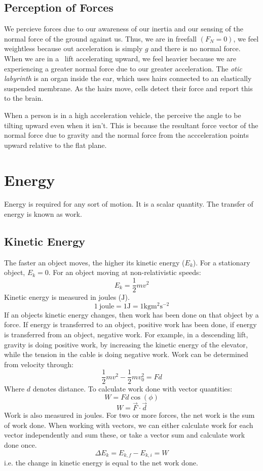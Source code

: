\documentclass[12pt]{report}
\begin{document}
\subsection*{Perception of Forces}
We percieve forces due to our awareness of our inertia and our sensing of the normal
force of the ground against us. Thus, we are in freefall \((F_N = 0)\), we feel weightless
because out acceleration is simply \(g\) and there is no normal force. When we are in a \
lift accelerating upward, we feel heavier because we are experiencing a greater normal force
due to our greater acceleration. The \textit{otic labyrinth} is an organ inside the ear, which
uses hairs connected to an elastically suspended membrane. As the hairs move, cells detect their
force and report this to the brain.

\bigskip
When a person is in a high acceleration vehicle, the perceive the angle to be tilting upward 
even when it isn't. This is because the resultant force vector of the normal force due to gravity
and the normal force from the accceleration points upward relative to the flat plane.

\section*{Energy}
Energy is required for any sort of motion. It is a scalar quantity. The transfer of 
energy is known as work.

\subsection*{Kinetic Energy}
The faster an object moves, the higher its kinetic energy (\(E_k\)). For a stationary object,
\(E_k = 0\). For an object moving at non-relativistic speeds:
\[E_k = \frac{1}{2}mv^2\]
Kinetic energy is measured in joules (\(\mathrm{J}\)).
\[1 \:\mathrm{joule} = 1\mathrm{J} = 1\mathrm{kg}\mathrm{m}^2\mathrm{s}^{-2}\]
If an objects kinetic energy changes, then work has been done on that object by a force.
If energy is transferred to an object, positive work has been done, if energy is transferred
from an object, negative work. For example, in a descending lift, gravity is doing positive work,
by increasing the kinetic energy of the elevator, while the tension in the cable is doing negative
work. Work can be determined from velocity through:
\[\frac{1}{2}mv^2 - \frac{1}{2}mv_0^2 = Fd\]
Where \(d\) denotes distance. To calculate work done with vector quantities:
\[W = Fd\cos(\phi)\]
\[W = \vec{F}\cdot\vec{d}\]
Work is also measured in joules. For two or more forces, the net work is the sum
of work done. When working with vectors, we can either calculate work for each vector
independently and sum these, or take a vector sum and calculate work done once.
\[\Delta E_k = E_{k,f} - E_{k,i} = W\]
i.e. the change in kinetic energy is equal to the net work done.
\end{document}
